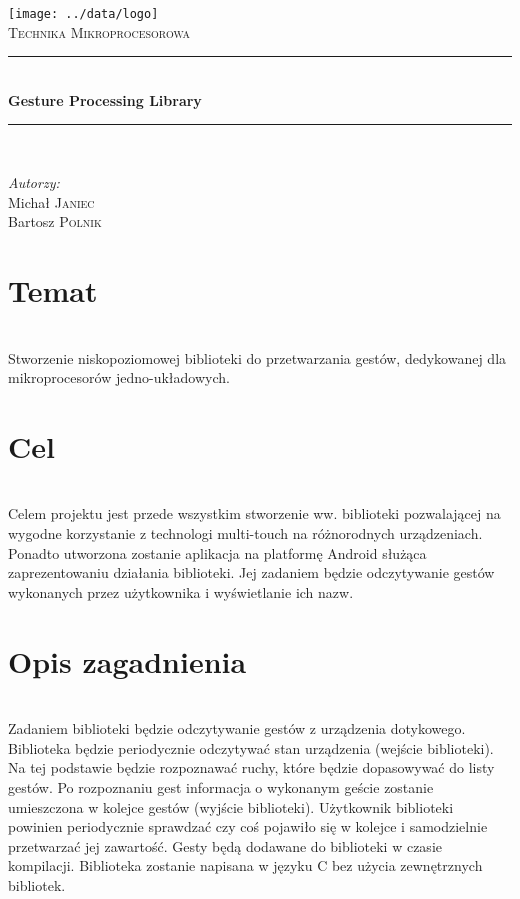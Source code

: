 \documentclass[a4paper,12pt]{article}
\newcommand{\HRule}{\rule{\linewidth}{0.5mm}}
\begin{document}
\begin{titlepage}
	\begin{center}
		\texttt{[image: ../data/logo]} \\[1cm]
		\textsc{\LARGE Technika Mikroprocesorowa} \\[0.8cm]
		\HRule \\[0.4cm]
		{ \huge \bfseries Gesture Processing Library} \\[0.4cm]
		\HRule \\[1.5cm]
	\end{center}
	\begin{minipage}{0.4\textwidth}
		\begin{flushleft} \large
		\emph{Autorzy:} \\
		Michał \textsc{Janiec} \\
		Bartosz \textsc{Polnik}
		\end{flushleft}
	\end{minipage}
\end{titlepage}
\thispagestyle{empty}

\tableofcontents

\section{Temat} \ \\[0.1cm]
\indent Stworzenie niskopoziomowej biblioteki do przetwarzania gestów, dedykowanej dla mikroprocesorów jedno-układowych.

\section{Cel} \ \\[0.1cm]
\indent Celem projektu jest przede wszystkim stworzenie ww. biblioteki pozwalającej na wygodne korzystanie z technologi multi-touch na różnorodnych urządzeniach. Ponadto utworzona zostanie aplikacja na platformę Android służąca zaprezentowaniu działania biblioteki. Jej zadaniem będzie odczytywanie gestów wykonanych przez użytkownika i wyświetlanie ich nazw.

\section{Opis zagadnienia} \ \\[0.1cm]
\indent Zadaniem biblioteki będzie odczytywanie gestów z urządzenia dotykowego. Biblioteka będzie periodycznie odczytywać stan urządzenia (wejście biblioteki). Na tej podstawie będzie rozpoznawać ruchy, które będzie dopasowywać do listy gestów. Po rozpoznaniu gest informacja o wykonanym geście zostanie umieszczona w kolejce gestów (wyjście biblioteki). Użytkownik biblioteki powinien periodycznie sprawdzać czy coś pojawiło się w kolejce i samodzielnie przetwarzać jej zawartość. Gesty będą dodawane do biblioteki w czasie kompilacji. Biblioteka zostanie napisana w języku C bez użycia zewnętrznych bibliotek.
\end{document}

